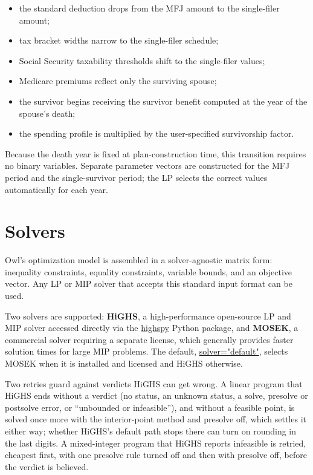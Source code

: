 \documentclass[fleqn,12pt]{report}
\newcommand{\code}[1]{\url{#1}}
\begin{document}
\begin{itemize}[nosep]
  \item the standard deduction drops from the MFJ amount to the
    single-filer amount;
  \item tax bracket widths narrow to the single-filer schedule;
  \item Social Security taxability thresholds shift to the single-filer
    values;
  \item Medicare premiums reflect only the surviving spouse;
  \item the survivor begins receiving the survivor benefit computed at the
    year of the spouse's death;
  \item the spending profile is multiplied by the user-specified
    survivorship factor.
\end{itemize}

Because the death year is fixed at plan-construction time, this transition
requires no binary variables.
Separate parameter vectors are constructed for the MFJ period and the
single-survivor period; the LP selects the correct values automatically
for each year.

\section{Solvers}

Owl's optimization model is assembled in a solver-agnostic matrix form:
inequality constraints, equality constraints, variable bounds, and an
objective vector.
Any LP or MIP solver that accepts this standard input format can be used.

Two solvers are supported: \textbf{HiGHS}, a high-performance open-source LP
and MIP solver accessed directly via the \code{highspy} Python package, and
\textbf{MOSEK}, a commercial solver requiring a separate license, which
generally provides faster solution times for large MIP problems.
The default, \code{solver="default"}, selects MOSEK when it is installed and
licensed and HiGHS otherwise.

Two retries guard against verdicts HiGHS can get wrong.  A linear program that HiGHS
ends without a verdict (no status, an unknown status, a solve, presolve or postsolve
error, or ``unbounded or infeasible''), and without a feasible point, is solved once
more with the interior-point method and presolve off, which settles it either way;
whether HiGHS's default path stops there can turn on rounding in the last digits.
A mixed-integer program that HiGHS reports infeasible is retried, cheapest first,
with one presolve rule turned off and then with presolve off, before the verdict is
believed.
\end{document}
